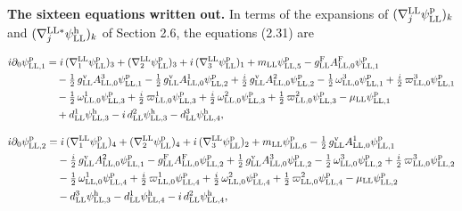 \documentclass[
  10pt,
]{article}
\begin{document}
\textbf{The sixteen equations written out.} In terms of the expansions
of \((\nabla^{\rm LL}_j\psi^{\rm p}_{\rm LL})_k\) and
\((\nabla^{{\rm LL}*}_j\psi^{\rm h}_{\rm LL})_k\) of Section 2.6, the
equations (2.31) are

\[\begin{aligned}
i\partial_0\psi^{\rm p}_{{\rm LL},1}&=i\,(\nabla^{\rm LL}_1\psi^{\rm p}_{\rm LL})_3+(\nabla^{\rm LL}_2\psi^{\rm p}_{\rm LL})_3+i\,(\nabla^{\rm LL}_3\psi^{\rm p}_{\rm LL})_1+m_{\rm LL}\psi^{\rm p}_{{\rm LL},5}-g^{\rm F}_{\rm LL}A^{\rm F}_{{\rm LL},0}\psi^{\rm p}_{{\rm LL},1}\\
&\quad -\tfrac{1}{2}\,g^{\rm v}_{\rm LL}A^{3}_{{\rm LL},0}\psi^{\rm p}_{{\rm LL},1}-\tfrac{1}{2}\,g^{\rm v}_{\rm LL}A^{1}_{{\rm LL},0}\psi^{\rm p}_{{\rm LL},2}+\tfrac{i}{2}\,g^{\rm v}_{\rm LL}A^{2}_{{\rm LL},0}\psi^{\rm p}_{{\rm LL},2}-\tfrac{1}{2}\,\omega^{3}_{{\rm LL},0}\psi^{\rm p}_{{\rm LL},1}+\tfrac{i}{2}\,\varpi^{3}_{{\rm LL},0}\psi^{\rm p}_{{\rm LL},1}\\
&\quad -\tfrac{1}{2}\,\omega^{1}_{{\rm LL},0}\psi^{\rm p}_{{\rm LL},3}+\tfrac{i}{2}\,\varpi^{1}_{{\rm LL},0}\psi^{\rm p}_{{\rm LL},3}+\tfrac{i}{2}\,\omega^{2}_{{\rm LL},0}\psi^{\rm p}_{{\rm LL},3}+\tfrac{1}{2}\,\varpi^{2}_{{\rm LL},0}\psi^{\rm p}_{{\rm LL},3}-\mu_{\rm LL}\psi^{\rm p}_{{\rm LL},1}\\
&\quad +d^{1}_{\rm LL}\psi^{\rm h}_{{\rm LL},3}-i\,d^{2}_{\rm LL}\psi^{\rm h}_{{\rm LL},3}-d^{3}_{\rm LL}\psi^{\rm h}_{{\rm LL},4},
\end{aligned}\]

\[\begin{aligned}
i\partial_0\psi^{\rm p}_{{\rm LL},2}&=i\,(\nabla^{\rm LL}_1\psi^{\rm p}_{\rm LL})_4+(\nabla^{\rm LL}_2\psi^{\rm p}_{\rm LL})_4+i\,(\nabla^{\rm LL}_3\psi^{\rm p}_{\rm LL})_2+m_{\rm LL}\psi^{\rm p}_{{\rm LL},6}-\tfrac{1}{2}\,g^{\rm v}_{\rm LL}A^{1}_{{\rm LL},0}\psi^{\rm p}_{{\rm LL},1}\\
&\quad -\tfrac{i}{2}\,g^{\rm v}_{\rm LL}A^{2}_{{\rm LL},0}\psi^{\rm p}_{{\rm LL},1}-g^{\rm F}_{\rm LL}A^{\rm F}_{{\rm LL},0}\psi^{\rm p}_{{\rm LL},2}+\tfrac{1}{2}\,g^{\rm v}_{\rm LL}A^{3}_{{\rm LL},0}\psi^{\rm p}_{{\rm LL},2}-\tfrac{1}{2}\,\omega^{3}_{{\rm LL},0}\psi^{\rm p}_{{\rm LL},2}+\tfrac{i}{2}\,\varpi^{3}_{{\rm LL},0}\psi^{\rm p}_{{\rm LL},2}\\
&\quad -\tfrac{1}{2}\,\omega^{1}_{{\rm LL},0}\psi^{\rm p}_{{\rm LL},4}+\tfrac{i}{2}\,\varpi^{1}_{{\rm LL},0}\psi^{\rm p}_{{\rm LL},4}+\tfrac{i}{2}\,\omega^{2}_{{\rm LL},0}\psi^{\rm p}_{{\rm LL},4}+\tfrac{1}{2}\,\varpi^{2}_{{\rm LL},0}\psi^{\rm p}_{{\rm LL},4}-\mu_{\rm LL}\psi^{\rm p}_{{\rm LL},2}\\
&\quad -d^{3}_{\rm LL}\psi^{\rm h}_{{\rm LL},3}-d^{1}_{\rm LL}\psi^{\rm h}_{{\rm LL},4}-i\,d^{2}_{\rm LL}\psi^{\rm h}_{{\rm LL},4},
\end{aligned}\]
\end{document}
